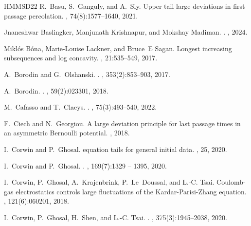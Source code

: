 \documentclass[reqno,11pt]{amsart}
\numberwithin{equation}{section}
\theoremstyle{definition}
\begin{document}
\begin{thebibliography}{HMMSD22}
R.~Basu, S.~Ganguly, and A.~Sly.
\newblock Upper tail large deviations in first passage percolation.
, 74(8):1577--1640, 2021.

Jnaneshwar Baslingker, Manjunath Krishnapur, and Mokshay Madiman.
.
, 2024.

Mikl{\'o}s B{\'o}na, Marie-Louise Lackner, and Bruce~E Sagan.
\newblock Longest increasing subsequences and log concavity.
, 21:535--549, 2017.

A.~Borodin and G.~Olshanski.
.
, 353(2):853--903, 2017.

A.~Borodin.
.
, 59(2):023301, 2018.

M.~Cafasso and T.~Claeys.
.
, 75(3):493--540, 2022.

F.~Ciech and N.~Georgiou.
\newblock A large deviation principle for last passage times in an asymmetric {B}ernoulli potential.
, 2018.

I.~Corwin and P.~Ghosal.
 equation tails for general initial data.
, 25, 2020.

I.~Corwin and P.~Ghosal.
.
, 169(7):1329 -- 1395, 2020.

I.~Corwin, P.~Ghosal, A.~Krajenbrink, P.~Le~Doussal, and L.-C. Tsai.
\newblock Coulomb-gas electrostatics controls large fluctuations of the {Kardar-Parisi-Zhang} equation.
, 121(6):060201, 2018.

I.~Corwin, P.~Ghosal, H.~Shen, and L.-C. Tsai.
.
, 375(3):1945--2038, 2020.


\end{thebibliography}
\end{document}
